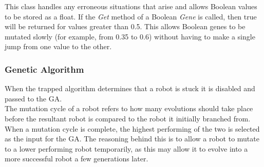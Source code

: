 \documentclass{article}
\begin{document}
\noindent This class handles any erroneous situations that arise and allows Boolean values to be stored as a float. If the \textit{Get} method of a Boolean \textit{Gene} is called, then true will be returned for values greater than 0.5. This allows Boolean genes to be mutated slowly (for example, from 0.35 to 0.6) without having to make a single jump from one value to the other. 

\subsubsection{Genetic Algorithm}
\label{sec:GA Imp}
When the trapped algorithm determines that a robot is stuck it is disabled and passed to the GA.\\

The mutation cycle of a robot refers to how many evolutions should take place before the resultant robot is compared to the robot it initially branched from. When a mutation cycle is complete, the highest performing of the two is selected as the input for the GA. The reasoning behind this is to allow a robot to mutate to a lower performing robot temporarily, as this may allow it to evolve into a more successful robot a few generations later.\\
\end{document}
